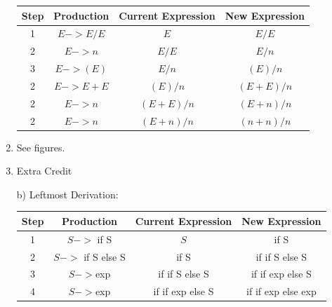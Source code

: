 \documentclass[12pt]{article}
\begin{document}
\begin{enumerate}
\begin{tabular}{| c | c |c| c|}
\hline
    Step & Production & Current Expression & New Expression \\ \hline \hline
    1 & $E -> E/E$ & $E$ & $E/E $\\
    2 & $E -> n$ & $E/E $& $E/n$ \\
    3 & $E -> (E)$ & $E/n $& $(E)/n$ \\
    2 & $E -> E+E$ & $(E)/n $& $(E+E)/n$ \\
    2 & $E -> n$ & $(E+E)/n $& $(E+n)/n$ \\
    2 & $E -> n$ & $(E+n)/n $& $(n+n)/n$ \\
\hline
\end{tabular}

\item See figures.


\item Extra Credit

b) Leftmost Derivation:

\begin{tabular}{| c | c | c| c|}
\hline
    Step & Production & Current Expression & New Expression \\ \hline \hline
    1 & $S -> $ if S & $S$ & if S\\
    2 & $S -> $ if S else S & if S & if if S else S \\
    3 & $S -> $exp & if if S else S& if if exp else S \\
    4 & $S -> $exp & if if exp else S & if if exp else exp \\
\hline
\end{tabular}


\end{enumerate}
\end{document}
